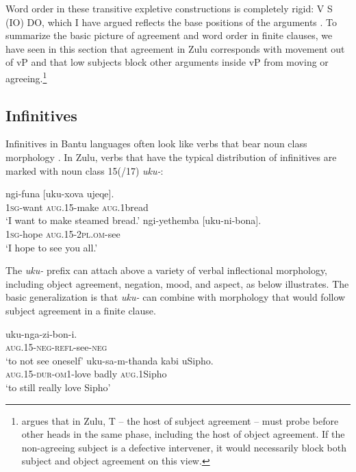\documentclass[output=paper,colorlinks,citecolor=brown]{langscibook}
\begin{document}
Word order in these transitive expletive constructions is completely rigid: V S (IO) DO, which I have argued reflects the base positions of the arguments \citep{Halpert2015}. To summarize the basic picture of agreement and word order in finite clauses, we have seen in this section that agreement in Zulu corresponds with movement out of vP and that low subjects block other arguments inside vP from moving or agreeing.\footnote{\citet{Zeller2015} argues that in Zulu, T – the host of subject agreement – must probe before other heads in the same phase, including the host of object agreement.  If the non-agreeing subject is a defective intervener, it would necessarily block both subject and object agreement on this view.} 
 
\subsection{Infinitives}\label{sec:halpert:2.2}
 
Infinitives in Bantu languages often look like verbs that bear noun class morphology \citep{Schadeberg2003}. In Zulu, verbs that have the typical distribution of infinitives are marked with noun class 15(/17) \textit{uku-}:

\ea%
    \label{ex:halpert:7}
    \ea%
    \label{ex:halpert:7a}
    \gll    ngi-funa [uku-xova ujeqe].\\
            1\textsc{sg}-want  \textsc{aug}.15-make \textsc{aug}.1bread\\
    \glt    `I want to make steamed bread.'
    \ex%
    \gll    ngi-yethemba [uku-ni-bona].\\
            1\textsc{sg}-hope  \textsc{aug}.15-2\textsc{pl}.\textsc{om}-see\\
    \glt    `I hope to see you all.'
    \z 
\z 

The \textit{uku-} prefix can attach above a variety of verbal inflectional morphology, including object agreement, negation, mood, and aspect, as  below illustrates.  The basic generalization is that \textit{uku-} can combine with morphology that would follow subject agreement in a finite clause.

\ea%
    \label{ex:halpert:8}
    \ea%
    \label{ex:halpert:8a}
    \gll    uku-nga-zi-bon-i.\\
            \textsc{aug}.15-\textsc{neg}-\textsc{refl}-see-\textsc{neg}\\
    \glt    `to not see oneself'
    \ex%
    \label{ex:halpert:8b}
    \gll    uku-sa-m-thanda kabi uSipho.\\
            \textsc{aug}.15-\textsc{dur}-\textsc{om}1-love badly \textsc{aug}.1Sipho\\
    \glt    `to still really love Sipho'
    \z 
\z 
\end{document}
